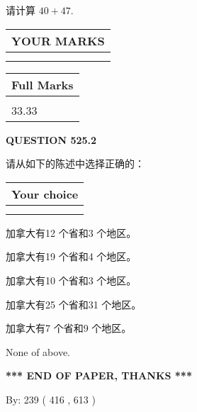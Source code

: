\documentclass{ctexart}
\begin{document}
  
 
请计算 $ %
40 +  %
47 $.
 

 

 
  
\vspace{0.2in}
  
\noindent\begin{tabular}{|l|}
\hline
 YOUR MARKS  \\
\hline
 \\ 
 \\ 
\hline
\end{tabular}
\hspace{0.05in} \begin{tabular}{|l|}
\hline
 Full Marks  \\
\hline
 \\ 
33.33 \\
\hline
\end{tabular}
{\textbf{\Large{QUESTION
525.2 
}}}
  
  
请从如下的陈述中选择正确的：
  
  
\noindent\hspace{3.0in} \begin{tabular}{|l|}
\hline
Your choice \\
\hline
 \\ 
 \\ 
\hline
\end{tabular}
  
  
 
 
加拿大有12 个省和3 个地区。
 
 
加拿大有19 个省和4 个地区。
 
 
加拿大有10 个省和3 个地区。
 
 
加拿大有25 个省和31 个地区。
 
 
加拿大有7 个省和9 个地区。
 
 
 None of above.
 
 
   
   
 \vspace{0.2in}
 
   
   
   
   
\vspace{1.0in} 
{\textbf{\large{ *** END OF PAPER, THANKS *** }}} 
   
   
\hspace{1.0in} By: 
 239 ( 416 ,  613 )
   
\end{document}
